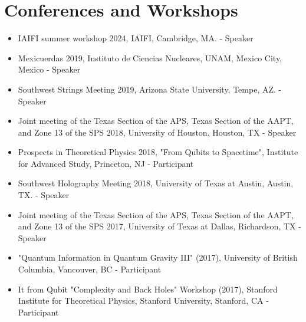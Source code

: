 \section*{Conferences and Workshops}
\begin{itemize}

\item IAIFI summer workshop 2024, IAIFI, Cambridge, MA. - Speaker

\item Mexicuerdas 2019, Instituto de Ciencias Nucleares, UNAM, Mexico City, Mexico - Speaker

\item Southwest Strings Meeting 2019, Arizona State University, Tempe, AZ. - Speaker

\item Joint meeting of the Texas Section of the APS, Texas Section of the AAPT, and Zone 13 of the SPS 2018, University of Houston, Houston, TX - Speaker

\item Prospects in Theoretical Physics 2018, "From Qubits to Spacetime", Institute for Advanced Study, Princeton, NJ - Participant

\item Southwest Holography Meeting 2018, University of Texas at Austin, Austin, TX. - Speaker

\item Joint meeting of the Texas Section of the APS, Texas Section of the AAPT, and Zone 13 of the SPS 2017, University of Texas at Dallas, Richardson, TX - Speaker

\item "Quantum Information in Quantum Gravity III" (2017), University of British Columbia, Vancouver, BC - Participant

\item It from Qubit "Complexity and Back Holes" Workshop (2017), Stanford Institute for Theoretical Physics, Stanford University, Stanford, CA - Participant

\end{itemize}

